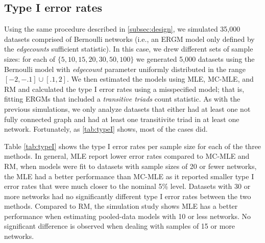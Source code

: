 \documentclass[review, nonatbib,doubleblind]{elsarticle/elsarticle}
\begin{document}
\subsection{Type I error rates}

Using the same procedure described in \autoref{subsec:design}, we simulated 35,000 datasets comprised of Bernoulli networks (i.e., an ERGM model only defined by the \textit{edgecounts} sufficient statistic). In this case, we drew  different sets of sample sizes: for each of $\{5, 10, 15, 20, 30, 50, 100\}$ we generated 5,000 datasets using the Bernoulli model with \textit{edgecount} parameter uniformly distributed in the range $[-2, -.1]\cup [.1, 2]$. We then estimated the models using MLE, MC-MLE, and RM and calculated the type I error rates using a misspecified model; that is, fitting ERGMs that included a \textit{transitive triads} count statistic. As with the previous simulations, we only analyze datasets that either had at least one not fully connected graph and had at least one transitivite triad in at least one network. Fortunately, as \autoref{tab:typeI} shows, most of the cases did.

Table \ref{tab:typeI} shows the type I error rates per sample size for each of the three methods. In general, MLE report lower error rates compared to MC-MLE and RM, when models were fit to datasets with sample sizes of 20 or fewer networks, the MLE had a better performance than MC-MLE as it reported smaller type I error rates that were much closer to the nominal 5\% level. Datasets with 30 or more networks had no significantly different type I error rates between the two methods. Compared to RM, the simulation study shows MLE has a better performance when estimating pooled-data models with 10 or less networks. No significant difference is observed when dealing with samples of 15 or more networks.
\end{document}
